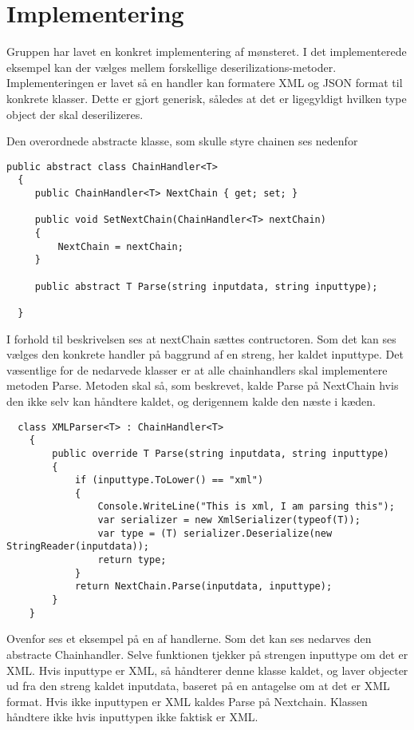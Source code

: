 \chapter{Implementering}

Gruppen har lavet en konkret implementering af mønsteret. I det implementerede eksempel kan der vælges mellem forskellige deserilizations-metoder. Implementeringen er lavet så en handler kan formatere XML og JSON format til konkrete klasser. Dette er gjort generisk, således at det er ligegyldigt hvilken type object der skal deserilizeres. 

Den overordnede abstracte klasse, som skulle styre chainen ses nedenfor

\begin{lstlisting}
public abstract class ChainHandler<T>
  {
     public ChainHandler<T> NextChain { get; set; }

     public void SetNextChain(ChainHandler<T> nextChain)
     {
         NextChain = nextChain;
     }

     public abstract T Parse(string inputdata, string inputtype);

  }
\end{lstlisting}  

I forhold til beskrivelsen ses at nextChain sættes contructoren. Som det kan ses vælges den konkrete handler på baggrund af en streng, her kaldet inputtype. Det væsentlige for de nedarvede klasser er at alle chainhandlers skal implementere metoden Parse. Metoden skal så, som beskrevet, kalde Parse på NextChain hvis den ikke selv kan håndtere kaldet, og derigennem kalde den næste i kæden.

\begin{lstlisting}
  class XMLParser<T> : ChainHandler<T>
    {
        public override T Parse(string inputdata, string inputtype)
        {
            if (inputtype.ToLower() == "xml")
            {
                Console.WriteLine("This is xml, I am parsing this");
                var serializer = new XmlSerializer(typeof(T));
                var type = (T) serializer.Deserialize(new StringReader(inputdata));
                return type;
            }
            return NextChain.Parse(inputdata, inputtype);
        }
    }
\end{lstlisting} 

Ovenfor ses et eksempel på en af handlerne. Som det kan ses nedarves den abstracte Chainhandler. Selve funktionen tjekker på strengen inputtype om det er XML. Hvis inputtype er XML, så håndterer denne klasse kaldet, og laver objecter ud fra den streng kaldet inputdata, baseret på en antagelse om at det er XML format. Hvis ikke inputtypen er XML kaldes Parse på Nextchain. Klassen håndtere ikke hvis inputtypen ikke faktisk er XML. 

